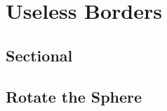 \chapter{Useless Borders}

\section{Sectional}
\lipsum[1-2]

\section{Rotate the Sphere}
\lipsum[1-5]